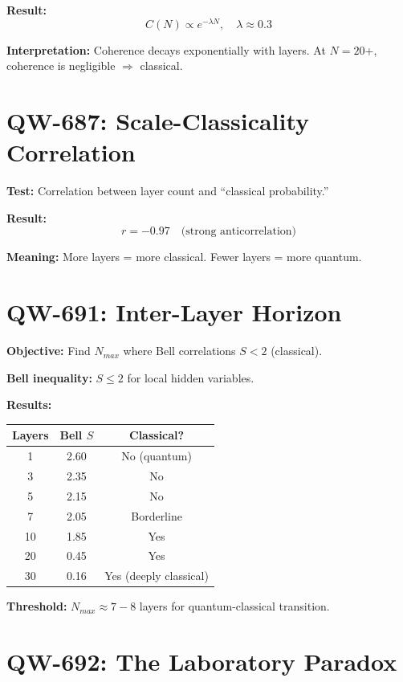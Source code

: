 \documentclass[11pt,a4paper]{book}
\theoremstyle{remark}
\begin{document}
\textbf{Result:}
\begin{equation}
C(N) \propto e^{-\lambda N}, \quad \lambda \approx 0.3
\end{equation}

\textbf{Interpretation:} Coherence decays exponentially with layers. At $N = 20$+, coherence is negligible $\Rightarrow$ classical.

\section{QW-687: Scale-Classicality Correlation}

\textbf{Test:} Correlation between layer count and ``classical probability.''

\textbf{Result:}
\begin{equation}
r = -0.97 \quad \text{(strong anticorrelation)}
\end{equation}

\textbf{Meaning:} More layers = more classical. Fewer layers = more quantum.

\section{QW-691: Inter-Layer Horizon}

\textbf{Objective:} Find $N_{max}$ where Bell correlations $S < 2$ (classical).

\textbf{Bell inequality:} $S \leq 2$ for local hidden variables.

\textbf{Results:}
\begin{center}
\begin{tabular}{|c|c|c|}
\hline
\textbf{Layers} & \textbf{Bell $S$} & \textbf{Classical?} \\
\hline
1 & 2.60 & No (quantum) \\
3 & 2.35 & No \\
5 & 2.15 & No \\
7 & 2.05 & Borderline \\
10 & 1.85 & Yes \\
20 & 0.45 & Yes \\
30 & 0.16 & Yes (deeply classical) \\
\hline
\end{tabular}
\end{center}

\textbf{Threshold:} $N_{max} \approx 7-8$ layers for quantum-classical transition.

\section{QW-692: The Laboratory Paradox}
\end{document}
